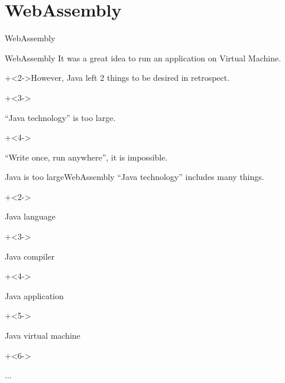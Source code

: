 %
%

\section{WebAssembly}


\begin{frame}{}{}
    {\Huge WebAssembly}
\end{frame}


\begin{frame}{WebAssembly}{}
    It was a great idea to run an application on Virtual Machine.
    \vspace{4ex}

    \onslide+<2->{However, Java left 2 things to be desired in retrospect.}
    \vspace{4ex}

    \begin{itemize}
        \onslide+<3->{\item ``Java technology'' is too large.}
        \onslide+<4->{\item ``Write once, run anywhere'', it is impossible.}
    \end{itemize}
\end{frame}


\begin{frame}{Java is too large}{WebAssembly}
    ``Java technology'' includes many things.
    \vspace{4ex}

    \begin{itemize}
        \onslide+<2->{\item Java language}
        \onslide+<3->{\item Java compiler}
        \onslide+<4->{\item Java application}
        \onslide+<5->{\item Java virtual machine}
        \onslide+<6->{\item ...}
    \end{itemize}
\end{frame}


